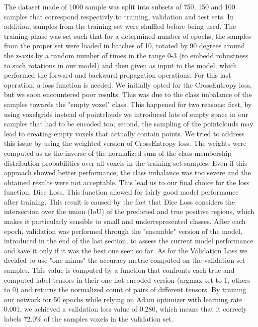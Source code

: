 The dataset made of 1000 sample was split into subsets of 750, 150 and 100 samples that correspond respectivly
to training, validation and test sets. In addition, samples from the training set were shuffled before being used.
The training phase was set such that for a determined number of epochs, the samples from the proper
set were loaded in batches of 10, rotated by 90 degrees around the z-axis by a random number
of times in the range 0-3 (to embedd robustness to such rotations in our model) and then given as 
input to the model, which performed the forward and backward propagation operations.
For this last operation, a loss function is needed.
We initially opted for the CrossEntropy loss, but we soon encountered poor results. This was due to the class imbalance of the
samples towards the "empty voxel" class. This happened for two reasons: first, by using voxelgrids instead of pointclouds
we introduced lots of empty space in our samples that had to be encoded too; second, the sampling of the pointclouds may lead 
to creating empty voxels that actually contain points.
We tried to address this issue by using the weighted version of CrossEntropy loss.
The weights were computed as as the inverse of the normalized sum of the class membership distribution probabilities 
over all voxels in the training set samples.
Even if this approach showed better performance, the class imbalance was too severe and the obtained results were not acceptable.
This lead us to our final choice for the loss function, Dice Loss.
This function allowed for fairly good model performance after training. This result is caused by the fact that Dice Loss considers 
the intersection over the union (IoU) of the predicted and true positive regions, which makes it particularly sensible to small 
and underrepresented classes.
After each epoch, validation was performed through the "ensamble" version of the model, introduced in the end of the last section,
to assess the current model performance and save it only if it was the best one seen so far. 
As for the Validation Loss we decided to use "one minus" the accuracy metric computed on the validation set samples.
This value is computed by a function that confronts each true and computed label tensors in their one-hot encoded version 
(argmax set to 1, others to 0) and returns the normalized count of pairs of different tensors.
By training our network for 50 epochs while relying on Adam optimizer with learning rate 0.001, we achieved a validation loss value of 0.280, which
means that it correcly labels 72.0\% of the samples voxels in the validation set.